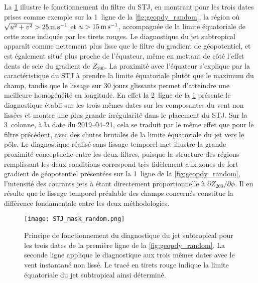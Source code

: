 \documentclass[../main.tex]{subfiles}
\begin{document}
La \cref{fig:STJ_random} illustre le fonctionnement du filtre du STJ, en montrant pour les trois dates prises comme exemple sur la 1\iere~ligne de la
\cref{fig:geopdy_random}, la région où $\sqrt{u^2 + v^2} > \SI{25}{\metre\per\second}$ et $u > \SI{15}{\metre\per\second}$, accompagnée de la limite équatoriale de cette zone indiquée par les tirets
rouges. Le diagnostique du jet subtropical apparaît comme nettement plus lisse que le filtre du gradient de géopotentiel, et est également situé plus proche de
l'équateur, même en mettant de côté l'effet dents de scie du gradient de $Z_{200}$. La proximité avec l'équateur s'explique par la caractéristique du STJ à
prendre la limite équatoriale plutôt que le maximum du champ, tandis que le lissage sur 30 jours glissants permet d'atteindre une meilleure homogénéité en
longitude. En effet la 2\ieme~ligne de la \cref{fig:STJ_random} présente le diagnostique établi sur les trois mêmes dates sur les composantes du vent non
lissées et montre une plus grande irrégularité dans le placement du STJ. Sur la 3\ieme~colonne, à la date du 2019--04--21, cela se traduit par le même effet que
pour le filtre précédent, avec des chutes brutales de la limite équatoriale du jet vers le pôle. Le diagnostique réalisé sans lissage temporel met illustre la
grande proximité conceptuelle entre les deux filtres, puisque la structure des régions remplissant les deux conditions correspond très fidèlement aux zones de
fort gradient de géopotentiel présentées sur la 1\iere~ligne de la \cref{fig:geopdy_random}, l'intensité des courants jets à  étant directement
proportionnelle à $\partial Z_{200} / \partial \phi$. Il en résulte que le lissage temporel préalable des champs concernés constitue la différence fondamentale
entre les deux méthodologies.

\begin{figure}[tb]
    \centering
    \texttt{[image: STJ\_mask\_random.png]}
    \caption{Principe de fonctionnement du diagnostique du jet subtropical pour les trois dates de la première ligne de la \cref{fig:geopdy_random}. La seconde
    ligne applique le diagnostique aux trois mêmes dates avec le vent instantané non lissé. Le tracé en tirets rouge indique la limite équatoriale du jet
    subtropical ainsi déterminé.}
    \label{fig:STJ_random}
\end{figure}
\end{document}
